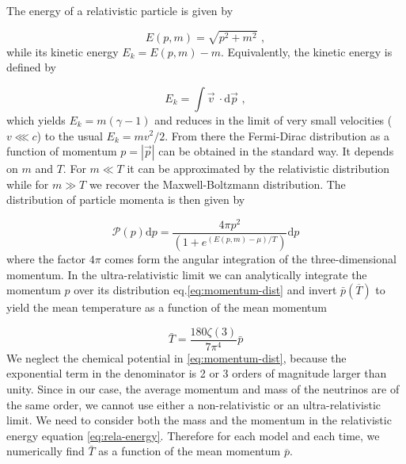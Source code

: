 The energy of a relativistic particle is given by

\begin{equation}
E(p,m)=\sqrt{p^{2}+m^{2}}\,\,,\label{eq:rela-energy}
\end{equation}
while its kinetic energy $E_{k}=E(p,m)-m$. Equivalently, the kinetic
energy is defined by

\begin{equation}
E_{k}=\int\vec{v}\:\cdot\mbox{d}\vec{p}\,\,,
\end{equation}
which yields $E_{k}=m(\gamma-1)$ and reduces in the limit of very
small velocities ($v\lll c$) to the usual $E_{k}=mv^{2}/2$. From
there the Fermi-Dirac distribution as a function of momentum $p=|\vec{p}|$
can be obtained in the standard way. It depends on $m$ and $T$.
For $m\ll T$ it can be approximated by the relativistic distribution
while for $m\gg T$ we recover the Maxwell-Boltzmann distribution.
The distribution of particle momenta is then given by

\begin{equation}
\mathcal{P}(p)\mbox{d}p=\frac{4\pi p^{2}}{(1+e^{(E(p,m)-\mu)/T})}\mbox{d}p\label{eq:momentum-dist}
\end{equation}
where the factor $4\pi$ comes form the angular integration of the
three-dimensional momentum. In the ultra-relativistic limit we can
analytically integrate the momentum $p$ over its distribution eq.\ref{eq:momentum-dist}
and invert $\bar{p}(\overline{T})$ to yield the mean temperature
as a function of the mean momentum

\begin{equation}
\bar{T}=\frac{180\zeta(3)}{7\pi^{4}}\bar{p}
\end{equation}
We neglect the chemical potential in \ref{eq:momentum-dist},
because the exponential term in the denominator is 2 or 3 orders of
magnitude larger than unity. Since in our case, the average momentum
and mass of the neutrinos are of the same order, we cannot use either
a non-relativistic or an ultra-relativistic limit. We need to consider
both the mass and the momentum in the relativistic energy equation
\ref{eq:rela-energy}. Therefore for each model and each time,
we numerically find $\bar{T}$ as a function of the mean momentum
$\overline{p}$.

